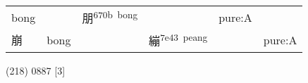 \documentclass[14pt,a4paper]{scrartcl}
\begin{document}
\begin{longtable}[c]{@{}llllll@{}}
\begin{minipage}[t]{0.14\columnwidth}
bong
\strut\end{minipage} &
\begin{minipage}[t]{0.14\columnwidth}\raggedright\strut
\strut\end{minipage} &
\begin{minipage}[t]{0.14\columnwidth}\raggedright\strut
朋\textsuperscript{670b~bong}
\strut\end{minipage} &
\begin{minipage}[t]{0.14\columnwidth}\raggedright\strut
\strut\end{minipage} &
\begin{minipage}[t]{0.14\columnwidth}\raggedright\strut
pure:A
\strut\end{minipage}\tabularnewline
\begin{minipage}[t]{0.14\columnwidth}\raggedright\strut
崩
\strut\end{minipage} &
\begin{minipage}[t]{0.14\columnwidth}\raggedright\strut
bong
\strut\end{minipage} &
\begin{minipage}[t]{0.14\columnwidth}\raggedright\strut
\strut\end{minipage} &
\begin{minipage}[t]{0.14\columnwidth}\raggedright\strut
繃\textsuperscript{7e43~peang}
\strut\end{minipage} &
\begin{minipage}[t]{0.14\columnwidth}\raggedright\strut
\strut\end{minipage} &
\begin{minipage}[t]{0.14\columnwidth}\raggedright\strut
pure:A
\strut\end{minipage}\tabularnewline
\bottomrule
\end{longtable}

(218) 0887 {[}3{]}
\end{document}
